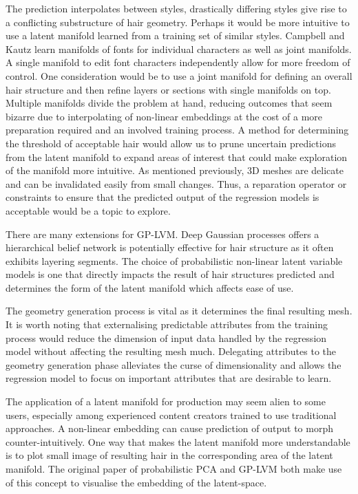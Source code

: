 \documentclass[ %
author={Dillon Keith Diep},
supervisor={Dr. Carl Henrik Ek},
degree={MEng},
title={ART-CG Hair:},
subtitle={Assisted Real-time Content Generation of Stylised Virtual Hair},
type={Research},
year={2017} ]{dissertation}
\begin{document}
The prediction interpolates between styles, drastically differing styles give rise to a conflicting substructure of hair geometry. Perhaps it would be more intuitive to use a latent manifold learned from a training set of similar styles. Campbell and Kautz \cite{fontmanifold} learn manifolds of fonts for individual characters as well as joint manifolds. A single manifold to edit font characters independently allow for more freedom of control. One consideration would be to use a joint manifold for defining an overall hair structure and then refine layers or sections with single manifolds on top. Multiple manifolds divide the problem at hand, reducing outcomes that seem bizarre due to interpolating of non-linear embeddings at the cost of a more preparation required and an involved training process.
A method for determining the threshold of acceptable hair would allow us to prune uncertain predictions from the latent manifold to expand areas of interest that could make exploration of the manifold more intuitive. 
As mentioned previously, 3D meshes are delicate and can be invalidated easily from small changes. Thus, a reparation operator or constraints to ensure that the predicted output of the regression models is acceptable would be a topic to explore.

There are many extensions for GP-LVM. Deep Gaussian processes \cite{deepgp} offers a hierarchical belief network is potentially effective for hair structure as it often exhibits layering segments.
The choice of probabilistic non-linear latent variable models is one that directly impacts the result of hair structures predicted and determines the form of the latent manifold which affects ease of use.

The geometry generation process is vital as it determines the final resulting mesh. It is worth noting that externalising predictable attributes from the training process would reduce the dimension of input data handled by the regression model without affecting the resulting mesh much. Delegating attributes to the geometry generation phase alleviates the curse of dimensionality and allows the regression model to focus on important attributes that are desirable to learn.

The application of a latent manifold for production may seem alien to some users, especially among experienced content creators trained to use traditional approaches. A non-linear embedding can cause prediction of output to morph counter-intuitively. One way that makes the latent manifold more understandable is to plot small image of resulting hair in the corresponding area of the latent manifold. The original paper of probabilistic PCA and GP-LVM both make use of this concept to visualise the embedding of the latent-space.
\end{document}
